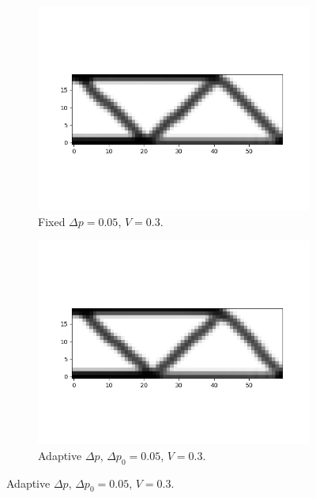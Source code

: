 \begin{figure}
    \begin{subfigure}{0.45\textwidth}
      \centering
      \includegraphics[width=1\textwidth]{images/adaptive_csimp/halfmbb_dec_tol_csimp_03_0001_80_false_001_ip.png}
      \caption{Fixed $\Delta p = 0.05$, $V = 0.3$.}
    \end{subfigure} \hfill
    \begin{subfigure}{0.45\textwidth}
      \centering
      \includegraphics[width=1\textwidth]{images/adaptive_csimp/halfmbb_dec_tol_csimp_03_0001_80_true_001_ip.png}
      \caption{Adaptive $\Delta p$, $\Delta p_0 = 0.05$, $V = 0.3$.}
    \end{subfigure}


\end{figure}
